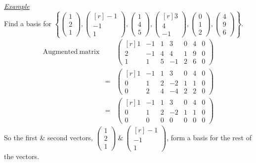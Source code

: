 \documentclass[11pt,a4paper]{article}
\begin{document}
\newpage\underline{\textit{Example}}\\
Find a basis for $\left\{ \begin{pmatrix} 1 \\ 2 \\ 1 \end{pmatrix}, \begin{pmatrix*}[r] -1 \\ -1 \\ 1 \end{pmatrix*}, \begin{pmatrix} 1 \\ 4 \\ 5 \end{pmatrix}, \begin{pmatrix*}[r] 3 \\ 4 \\ -1\end{pmatrix*}, \begin{pmatrix} 0 \\ 1 \\ 2 \end{pmatrix}, \begin{pmatrix} 4 \\ 9 \\ 6 \end{pmatrix}  \right\}$.
\[\begin{array}{rcl}
\mathrm{Augmented\ matrix} & & \begin{pmatrix*}[r] 1 & -1 & 1 & 3 & 0 & 4 & 0 \\ 2 & -1 & 4 & 4 & 1 & 9 & 0 \\ 1 & 1 & 5 & -1 & 2 & 6 & 0  \end{pmatrix*}\\
&=& \begin{pmatrix*}[r] 1 & -1 & 1 & 3 & 0 & 4 & 0 \\ 0 & 1 & 2 & -2 & 1 & 1 & 0 \\ 0 & 2 & 4 & -4 & 2 & 2 & 0 \end{pmatrix*}\\
&=& \begin{pmatrix*}[r] 1 & -1 & 1 & 3 & 0 & 4 & 0 \\ 0 & 1 & 2 & -2 & 1 & 1 & 0 \\ 0 & 0 & 0 & 0 & 0 & 0 & 0 \end{pmatrix*}
\end{array}\]
So the first \& second vectors, $\begin{pmatrix} 1 \\ 2 \\ 1 \end{pmatrix}\ \&\ \begin{pmatrix*}[r] -1 \\ -1 \\ 1 \end{pmatrix*}$, form a basis for the rest of the vectors.\\
\end{document}

